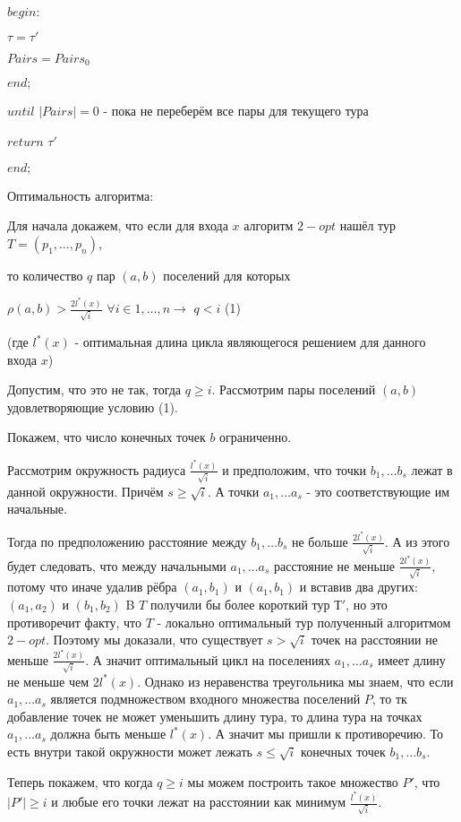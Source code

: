 \documentclass[a4paper,12pt]{article}
\begin{document}
$begin:$

$\tau = \tau'$

$Pairs = Pairs_0$

$end;$

$until$ $|Pairs|=0$ - пока не переберём все пары для текущего тура

$return$ $\tau'$

$end;$ 

Оптимальность алгоритма: 

Для начала докажем, что если для входа $x$ алгоритм $2-opt$  нашёл тур $T=(p_1, \dots, p_n)$, 

то количество $q$ пар $(a,b)$ поселений для которых 

$\rho(a,b)>\frac{2 l^*(x)}{\sqrt{i}}$ $\forall i \in 1, \dots, n \rightarrow$ $q<i$ (1)

(где $l^*(x)$ - оптимальная длина цикла являющегося решением для данного входа $x$)



Допустим, что это не так, тогда $q\geq i$. Рассмотрим пары поселений $(a, b)$ удовлетворяющие условию (1).

Покажем, что число конечных точек $b$ ограниченно.

Рассмотрим окружность радиуса $\frac{ l^*(x)}{\sqrt{i}}$ и предположим, что точки $b_1, \dots b_s$ лежат в данной окружности. Причём $s\geq\sqrt{i}$. А точки $a_1, \dots a_s$ - это соответствующие им начальные. 

Тогда по предположению расстояние между $b_1, \dots b_s$ не больше $\frac{2 l^*(x)}{\sqrt{i}}$. А из этого будет следовать, что между начальными $a_1, \dots a_s$ расстояние не меньше $\frac{2 l^*(x)}{\sqrt{i}}$, потому что иначе удалив рёбра $(a_1, b_1)$ и $(a_1, b_1)$ и вставив два других: $(a_1, a_2)$ и $(b_1, b_2)$ B $T$ получили бы более короткий тур $Т'$, но это противоречит факту, что $T$ - локально оптимальный тур полученный алгоритмом $2-opt$. Поэтому мы доказали, что существует $s>\sqrt{i}$ точек на расстоянии не меньше  $\frac{2 l^*(x)}{\sqrt{i}}$. А значит оптимальный цикл на поселениях $a_1, \dots a_s$ имеет длину не меньше чем $2l^*(x)$. Однако из неравенства треугольника мы знаем, что если $a_1, \dots a_s$ является подмножеством входного множества поселений $P$, то тк добавление точек не может уменьшить длину тура, то длина тура на точках $a_1, \dots a_s$ должна быть меньше $l^*(x)$. А значит мы пришли к противоречию. То есть внутри такой окружности может лежать $s\leq\sqrt{i}$ конечных точек $b_1, \dots b_s$.

Теперь покажем, что когда $q\geq i$ мы можем построить такое множество $P'$, что $|P'|\geq i$ и любые его точки лежат на расстоянии как минимум $\frac{ l^*(x)}{\sqrt{i}}$.
\end{document}

